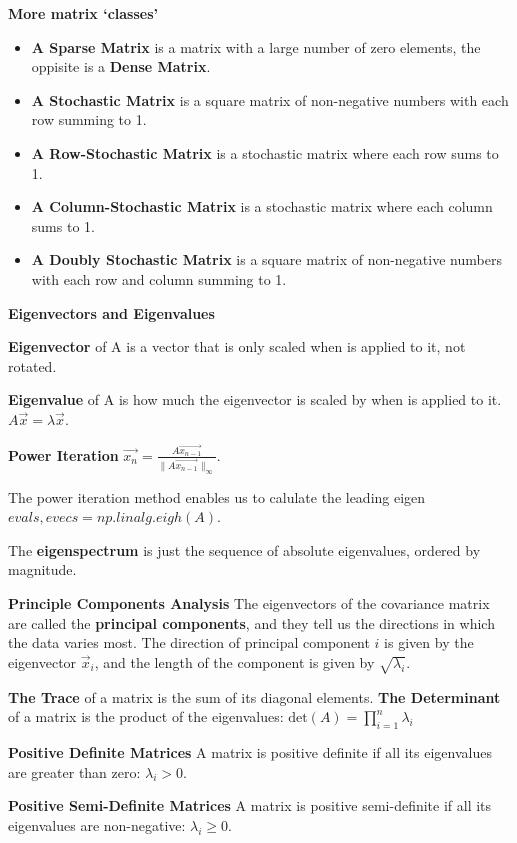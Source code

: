 \documentclass{article}
\begin{document}
\textbf{More matrix `classes'}
\begin{itemize}
    \item \textbf{A Sparse Matrix} is a matrix with a large number of zero elements, the oppisite is a \textbf{Dense Matrix}.
    \item \textbf{A Stochastic Matrix} is a square matrix of non-negative numbers with each row summing to 1.
    \item \textbf{A Row-Stochastic Matrix} is a stochastic matrix where each row sums to 1.
    \item \textbf{A Column-Stochastic Matrix} is a stochastic matrix where each column sums to 1.
    \item \textbf{A Doubly Stochastic Matrix} is a square matrix of non-negative numbers with each row and column summing to 1.
\end{itemize}

\vspace{\baselineskip}

\textbf{Eigenvectors and Eigenvalues}

\textbf{Eigenvector} of A is a vector that is only scaled when is applied to it, not rotated.

\textbf{Eigenvalue} of A is how much the eigenvector is scaled by when is applied to it.
$A\vec{x} = \lambda  \vec{x}$.

\textbf{Power Iteration}
$\vec{x_n} = \frac{A \vec{x_{n-1}}}{\|A\vec{x_{n-1}}\|_\infty}$.

The power iteration method enables us to calulate the leading eigen
$evals, evecs = np.linalg.eigh(A)$.

The \textbf{eigenspectrum} is just the sequence of absolute eigenvalues, ordered by magnitude.

\textbf{Principle Components Analysis}
The eigenvectors of the covariance matrix are called the \textbf{principal components}, and they tell us the
directions in which the data varies most.
The direction of principal component $i$ is given by the eigenvector $\vec{x}_i$, and the length of the
component is given by $\sqrt{\lambda_i}$.

\textbf{The Trace} of a matrix is the sum of its diagonal elements.
\textbf{The Determinant} of a matrix is the product of the eigenvalues: $\text{det}(A) = \prod_{i=1}^n \lambda_i$

\textbf{Positive Definite Matrices}
A matrix is positive definite if all its eigenvalues are greater than zero: $\lambda_i > 0$.

\textbf{Positive Semi-Definite Matrices}
A matrix is positive semi-definite if all its eigenvalues are non-negative: $\lambda_i \geq 0$.
\end{document}
